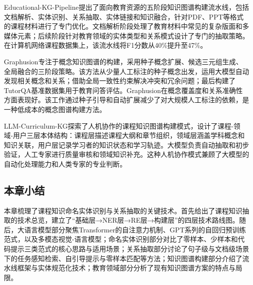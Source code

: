 Educational-KG-Pipeline提出了面向教育资源的五阶段知识图谱构建流水线\cite{educational_kg_pipeline_2025}，包括文档解析、实体识别、关系抽取、实体链接和知识融合，针对PDF、PPT等格式的课程材料进行了专门优化。文档解析阶段处理了教育材料中常见的复杂版面和多媒体元素；后续阶段针对教育领域的实体类型和关系模式设计了专门的抽取策略。在计算机网络课程数据集上，该流水线将F1分数从40\%提升至47\%。

Graphusion专注于概念知识图谱的构建\cite{graphusion_2024}，采用种子概念扩展、候选三元组生成、全局融合的三阶段策略。该方法从少量人工标注的种子概念出发，运用大模型自动发现相关概念和关系；借助全局一致性约束解决冲突和冗余问题；最后构建了TutorQA基准数据集用于教育问答评估。Graphusion在概念覆盖度和关系准确性方面表现好。该工作通过种子引导和自动扩展减少了对大规模人工标注的依赖，是一种低成本的概念图谱构建方法。

LLM-Curriculum-KG探索了人机协作的课程知识图谱构建模式\cite{llm_curriculum_kg_2025}，设计了课程-领域-用户三层本体结构：课程层描述课程大纲和章节组织，领域层涵盖学科概念和知识关联，用户层记录学习者的知识状态和学习轨迹。大模型负责自动抽取和初步验证，人工专家进行质量审核和领域知识补充。这种人机协作模式兼顾了大模型的自动化处理能力和人类专家的专业判断。

\subsection{本章小结}

本章梳理了课程知识命名实体识别与关系抽取的关键技术。首先给出了课程知识抽取的技术总览，建立了“基础层→NER层→RE层→构建层”的四层技术路线图。随后，大语言模型部分聚焦Transformer的自注意力机制、GPT系列的自回归预训练范式，以及多模态视觉-语言模型；命名实体识别部分对比了零样本、少样本和代码提示三类范式的核心思路与适用场景；关系抽取部分讨论了句子级与文档级场景下的任务感知检索、自引导提示与零样本匹配等方法；知识图谱构建部分介绍了流水线框架与实体规范化技术；教育领域部分分析了现有知识图谱方案的特点与局限。
